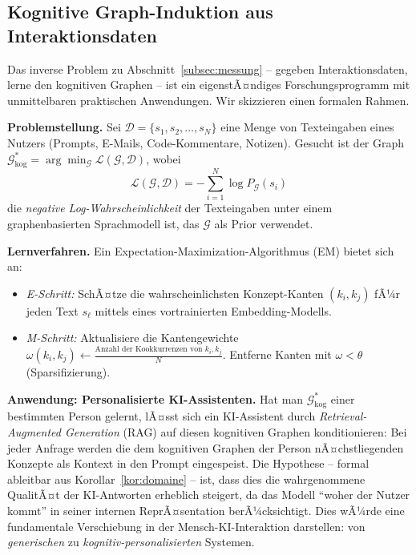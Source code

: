 ﻿\documentclass[12pt,a4paper]{article}
\theoremstyle{plain}
\theoremstyle{definition}
\theoremstyle{remark}
\newcommand{\GG}{\mathcal{G}}
\begin{document}
\subsection{Kognitive Graph-Induktion aus Interaktionsdaten}
\label{subsec:induktion}

Das inverse Problem zu Abschnitt~\ref{subsec:messung} -- gegeben Interaktionsdaten, lerne den kognitiven Graphen -- ist ein eigenstÃ¤ndiges Forschungsprogramm mit unmittelbaren praktischen Anwendungen. Wir skizzieren einen formalen Rahmen.

\textbf{Problemstellung.} Sei $\mathcal{D} = \{s_1, s_2, \ldots, s_N\}$ eine Menge von Texteingaben eines Nutzers (Prompts, E-Mails, Code-Kommentare, Notizen). Gesucht ist der Graph $\GG_{\text{kog}}^* = \arg\min_\GG \mathcal{L}(\GG, \mathcal{D})$, wobei
\[
  \mathcal{L}(\GG, \mathcal{D}) = -\sum_{i=1}^N \log P_{\GG}(s_i)
\]
die \emph{negative Log-Wahrscheinlichkeit} der Texteingaben unter einem graphenbasierten Sprachmodell ist, das $\GG$ als Prior verwendet.

\textbf{Lernverfahren.} Ein Expectation-Maximization-Algorithmus (EM) bietet sich an:
\begin{itemize}
  \item \textit{E-Schritt:} SchÃ¤tze die wahrscheinlichsten Konzept-Kanten $(k_i, k_j)$ fÃ¼r jeden Text $s_\ell$ mittels eines vortrainierten Embedding-Modells.
  \item \textit{M-Schritt:} Aktualisiere die Kantengewichte $\omega(k_i, k_j) \leftarrow \frac{\text{Anzahl der Kookkurrenzen von } k_i, k_j}{N}$. Entferne Kanten mit $\omega < \theta$ (Sparsifizierung).
\end{itemize}

\textbf{Anwendung: Personalisierte KI-Assistenten.} Hat man $\GG_{\text{kog}}^*$ einer bestimmten Person gelernt, lÃ¤sst sich ein KI-Assistent durch \emph{Retrieval-Augmented Generation} (RAG) auf diesen kognitiven Graphen konditionieren: Bei jeder Anfrage werden die dem kognitiven Graphen der Person nÃ¤chstliegenden Konzepte als Kontext in den Prompt eingespeist. Die Hypothese -- formal ableitbar aus Korollar~\ref{kor:domaine} -- ist, dass dies die wahrgenommene QualitÃ¤t der KI-Antworten erheblich steigert, da das Modell ``woher der Nutzer kommt'' in seiner internen ReprÃ¤sentation berÃ¼cksichtigt. Dies wÃ¼rde eine fundamentale Verschiebung in der Mensch-KI-Interaktion darstellen: von \emph{generischen} zu \emph{kognitiv-personalisierten} Systemen.
\end{document}
